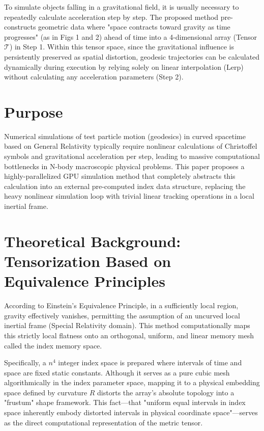 \documentclass[11pt]{article}
\begin{document}
To simulate objects falling in a gravitational field, it is usually necessary to repeatedly calculate acceleration step by step. The proposed method pre-constructs geometric data where "space contracts toward gravity as time progresses" (as in Figs 1 and 2) ahead of time into a 4-dimensional array (Tensor $\mathcal{T}$) in Step 1. Within this tensor space, since the gravitational influence is persistently preserved as spatial distortion, geodesic trajectories can be calculated dynamically during execution by relying solely on linear interpolation (Lerp) without calculating any acceleration parameters (Step 2).

\section{Purpose}
Numerical simulations of test particle motion (geodesics) in curved spacetime based on General Relativity typically require nonlinear calculations of Christoffel symbols and gravitational acceleration per step, leading to massive computational bottlenecks in N-body macroscopic physical problems. This paper proposes a highly-parallelized GPU simulation method that completely abstracts this calculation into an external pre-computed index data structure, replacing the heavy nonlinear simulation loop with trivial linear tracking operations in a local inertial frame.

\section{Theoretical Background: Tensorization Based on Equivalence Principles}
According to Einstein's Equivalence Principle, in a sufficiently local region, gravity effectively vanishes, permitting the assumption of an uncurved local inertial frame (Special Relativity domain). This method computationally maps this strictly local flatness onto an orthogonal, uniform, and linear memory mesh called the index memory space.

Specifically, a $n^4$ integer index space is prepared where intervals of time and space are fixed static constants. Although it serves as a pure cubic mesh algorithmically in the index parameter space, mapping it to a physical embedding space defined by curvature $R$ distorts the array's absolute topology into a "frustum" shape framework. This fact—that "uniform equal intervals in index space inherently embody distorted intervals in physical coordinate space"—serves as the direct computational representation of the metric tensor.
\end{document}
